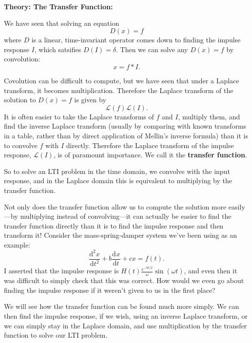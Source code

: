\documentclass{article}
\newcommand{\deriv}[3][]{\frac{\mathrm{d}^{#1}#2}{\mathrm{d}#3^{#1}}}
\begin{document}
\textbf{Theory: The Transfer Function:}\bigskip


We have seen that solving an equation
\[D(x)=f\]
where $D$ is a linear, time-invariant operator comes down to finding the impulse response $I$, which satsifies $D(I)=\delta$. Then we can solve any $D(x)=f$ by convolution:
\[x=f\ast I.\]

Covolution can be difficult to compute, but we have seen that under a Laplace transform, it becomes multiplication. Therefore the Laplace transform of the solution to $D(x)=f$ is given by
\[\mathcal{L}(f)\mathcal{L}(I).\]
It is often easier to take the Laplace transforms of $f$ and $I$, multiply them, and find the inverse Laplace transform (usually by comparing with known transforms in a table, rather than by direct application of Mellin's inverse formula) than it is to convolve $f$ with $I$ directly. Therefore the Laplace transform of the impulse response, $\mathcal{L}(I)$, is of paramount importance. We call it the \textbf{transfer function}.

So to solve an LTI problem in the time domain, we convolve with the input response, and in the Laplace domain this is equivalent to multiplying by the transfer function.\bigskip


Not only does the transfer function allow us to compute the solution more easily---by multiplying instead of convolving---it can actually be easier to find the transfer function directly than it is to find the impulse response and then transform it! Consider the mass-spring-damper system we've been using as an example:
\[\deriv[2]{x}{t}+b\deriv{x}{t}+cx=f(t).\]
I asserted that the impulse response is $H(t)\frac{e^{-bt/2}}{\omega}\sin(\omega t)$, and even then it was difficult to simply check that this was correct. How would we even go about finding the impulse response if it weren't given to us in the first place?

We will see how the transfer function can be found much more simply. We can then find the impulse response, if we wish, using an inverse Laplace transform, or we can simply stay in the Laplace domain, and use multiplication by the transfer function to solve our LTI problem.





\clearpage
\end{document}
